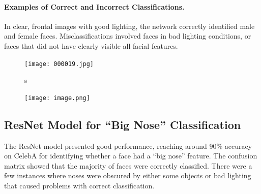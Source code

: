 \documentclass{article}
\begin{document}
\paragraph{Examples of Correct and Incorrect Classifications.}
In clear, frontal images with good lighting, the network correctly identified male and female faces. Misclassifications involved faces in bad lighting conditions, or faces that did not have clearly visible all facial features.
\vspace{0.2cm}
\begin{figure}[ht]
    \centering
    \begin{minipage}{0.2\linewidth}
        \centering
        \texttt{[image: 000019.jpg]}
        \label{fig:first}
    \end{minipage}
    \hspace{0.05\linewidth} s
    \begin{minipage}{0.2\linewidth}
        \centering
        \texttt{[image: image.png]}
        \label{fig:second}
    \end{minipage}
    \label{fig:side-by-side}
\end{figure}


\subsection{ResNet Model for “Big Nose” Classification}
The ResNet model presented good performance, reaching around 90\% accuracy on CelebA for identifying whether a face had a “big nose” feature. The confusion matrix showed that the majority of faces were correctly classified. There were a few instances where noses were obscured by either some objects or bad lighting that caused problems with correct classification.
\end{document}
